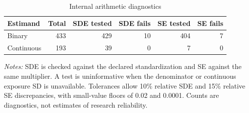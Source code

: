 \begin{table}[htbp]\centering\small
\caption{Internal arithmetic diagnostics}\label{tab:identities}
\setlength{\tabcolsep}{4pt}
\begin{tabular}{lrrrrr}\toprule
Estimand & Total & SDE tested & SDE fails & SE tested & SE fails \\
\midrule
Binary & 433 & 429 & 10 & 404 & 7 \\
Continuous & 193 & 39 & 0 & 7 & 0 \\
\bottomrule\end{tabular}
\par\vspace{4pt}\begin{minipage}{\textwidth}\footnotesize
\textit{Notes:} SDE is checked against the declared standardization and SE against the same multiplier. A test is uninformative when the denominator or continuous exposure SD is unavailable. Tolerances allow 10\% relative SDE and 15\% relative SE discrepancies, with small-value floors of 0.02 and 0.0001. Counts are diagnostics, not estimates of research reliability.
\end{minipage}
\end{table}
